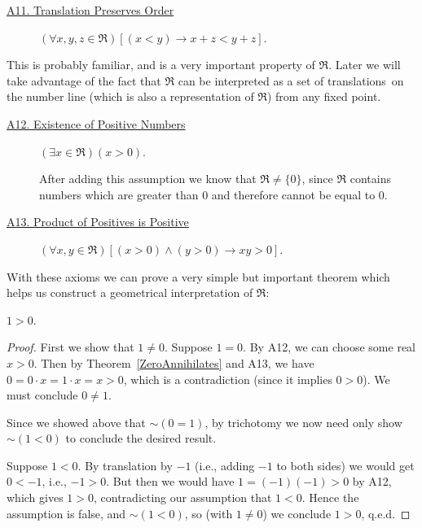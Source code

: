 \begin{description}

\item[\ul{A11. Translation \vphantom{g}Preserves Order}]
 $(\forall x,y,z\in\Re)[(x< y)\longrightarrow x+z< y+z]$. 
\end{description}
This is probably familiar, and is a very important property of $\Re$.
Later we will take advantage of the fact that $\Re$ can be 
interpreted as a set of translations\footnotemark\   
on the number line (which is
also a representation of $\Re$) from any fixed point. 
\begin{description}
\item[\ul{A12. Existence of Positive Numbers}]
$(\exists x\in\Re)(x>0)$.

After adding this assumption we know that $\Re\ne\{0\}$, since $\Re$
contains numbers which are greater than $0$ and therefore
cannot be equal to $0$.


\item[\ul{A13. Product of\vphantom{g}
 Positives is Positive}]
 $(\forall x,y\in\Re)[( x>0)\wedge(y>0)\longrightarrow xy>0]$.
\end{description}

With these axioms we can prove a very simple but important theorem which
helps us construct a geometrical interpretation of $\Re$:
\begin{theorem}$1>0$.\label{1>0}\end{theorem}
\bigskip

\begin{proof} First we show  that $1\ne0$. 
Suppose $1=0$.  By A12, we can choose some real $x>0$.  Then
by Theorem~\ref{ZeroAnnihilates} and 
A13, we have $0=0\cdot x= 1\cdot x=x>0$, 
which is a contradiction (since it implies $0>0$).  
We must conclude $0\ne1$.

Since we showed above that $\sim(0=1)$,
by trichotomy we now need only show $\sim(1<0)$
to conclude the desired result.  

Suppose
$1<0$.  By translation by $-1$ (i.e., adding $-1$ to 
both sides) we would get $0<-1$, i.e., $-1>0$.
But then we would have $1=(-1)(-1)>0$ by A12, which gives $1>0$, 
contradicting our assumption that $1<0$.  Hence the assumption is 
false, and $\sim(1<0)$, so (with $1\ne 0$) we conclude $1>0$, q.e.d.
\end{proof}

